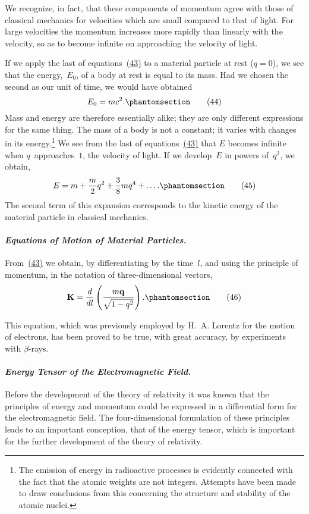\documentclass[12pt]{book}[2005/09/16]
\newcommand{\Paragraph}[1]{\paragraph*{\indent\normalfont\itshape#1}}
\newcommand{\Change}[2]{#2}
\newcommand{\Add}[1]{\Change{}{#1}}
\newcommand{\PageSep}[1]{\ignorespaces}
\newcommand{\Tag}[1]{%
  \phantomsection
  \label{eqn:#1}
  \tag*{#1}
}
\newcommand{\Eqref}[1]{\hyperref[eqn:#1]{#1}}
\newcommand{\Vector}[1]{\mathbf{#1}}
\newcommand{\q}{\Vector{q}}
\newcommand{\K}{\Vector{K}}
\begin{document}
We recognize, in fact, that these components of
momentum agree with those of classical mechanics for
velocities which are small compared to that of light. For
large velocities the momentum increases more rapidly
than linearly with the velocity, so as to become infinite
on approaching the velocity of light.

If we apply the last of equations~\Eqref{(43)} to a material
particle at rest ($q = 0$), we see that the energy,~$E_{0}$, of a
%
body at rest is equal to its mass. Had we chosen the
second as our unit of time, we would have obtained
\[
E_{0} = mc^{2}\Add{.}
\Tag{(44)}
\]
Mass and energy are therefore essentially alike; they are
%
%
only different expressions for the same thing. The mass
of a body is not a constant; it varies with changes in its
energy.\footnote
  {The emission of energy in radioactive processes is evidently connected
  with the fact that the atomic weights are not integers. Attempts have
  been made to draw conclusions from this concerning the structure and
  stability of the atomic nuclei.}
We see from the last of equations~\Eqref{(43)} that $E$
becomes infinite when $q$~approaches~$1$, the velocity of
light. If we develop~$E$ in powers of~$q^{2}$, we obtain,
\[
E = m + \frac{m}{2}q^{2} + \frac{3}{8}mq^{4} +\dots\Add{.}
\Tag{(45)}
\]
\PageSep{52}
The second term of this expansion corresponds to the
kinetic energy of the material particle in classical
mechanics.

\Paragraph{Equations of Motion of Material Particles.} From~\Eqref{(43)}
\index{Equations of motion of \Change{materia}{material} particle}%
%
we obtain, by differentiating by the time~$l$, and using
the principle of momentum, in the notation of three-dimensional
vectors,
\[
\K = \frac{d}{dl}\left(\frac{m\q}{\sqrt{1 - q^{2}}}\right)\Add{.}
\Tag{(46)}
\]

This equation, which was previously employed by
H.~A. Lorentz for the motion of electrons, has been
proved to be true, with great accuracy, by experiments
with $\beta$-rays.

\Paragraph{Energy Tensor of the Electromagnetic Field.} Before the
%
development of the theory of relativity it was known
that the principles of energy and momentum could
be expressed in a differential form for the electromagnetic
field. The four-dimensional formulation of
these principles leads to an important conception, that of
the energy tensor, which is important for the further
development of the theory of relativity.
\end{document}
